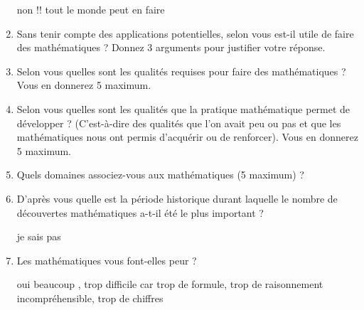 \documentclass{article}
\begin{document}
\begin{enumerate}
    non !! tout le monde peut en faire 
  \item Sans tenir compte des applications potentielles, selon vous est-il
    utile de faire des mathématiques ? Donnez 3 arguments pour justifier
    votre réponse.
  \item Selon vous quelles sont les qualités requises pour faire des
    mathématiques ? Vous en donnerez 5 maximum. 
  \item Selon vous quelles sont les qualités que la pratique
    mathématique permet de développer ? (C'est-à-dire des qualités que
    l'on avait peu ou pas et que les mathématiques nous ont permis
    d'acquérir ou de renforcer). Vous en donnerez 5 maximum. 
  \item Quels domaines associez-vous aux mathématiques (5 maximum) ?
  \item D'après vous quelle est la période historique durant laquelle le
    nombre de découvertes mathématiques a-t-il été le plus important ? 
    
    je sais pas
  \item Les mathématiques vous font-elles peur ?

    oui beaucoup , trop difficile car trop de formule, trop de
    raisonnement incompréhensible, trop de chiffres  
  \end{enumerate}
\end{document}
